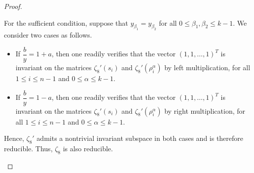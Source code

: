 \documentclass[10pt,a4paper]{amsart}
\begin{document}
\begin{proof}
\begin{itemize}
For the sufficient condition, suppose that $y_{\beta_1}=y_{\beta_2}$ for all $0 \le \beta_1, \beta_2 \le k-1$. We consider two cases as follows.
\begin{itemize}
    \item[(i)] If $\dfrac{b}{y}=1+a$, then one readily verifies that the vector $(1,1,\ldots,1)^T$ is invariant on the matrices $\zeta_8'(s_i)$ and $\zeta_8'(\rho_i^{\alpha})$ by left multiplication, for all $1\leq i\leq n-1$ and $0\leq \alpha \leq k-1$.
    
    \item[(ii)] If $\dfrac{b}{y}=1-a$, then one readily verifies that the vector $(1,1,\ldots,1)^T$ is invariant on the matrices $\zeta_8'(s_i)$ and $\zeta_8'(\rho_i^{\alpha})$ by right multiplication, for all $1\leq i\leq n-1$ and $0\leq \alpha \leq k-1$.
\end{itemize}

Hence, $\zeta_8'$ admits a nontrivial invariant subspace in both cases and is therefore reducible. Thus, $\zeta_8$ is also reducible.
\end{itemize}
\end{proof}
\end{document}
